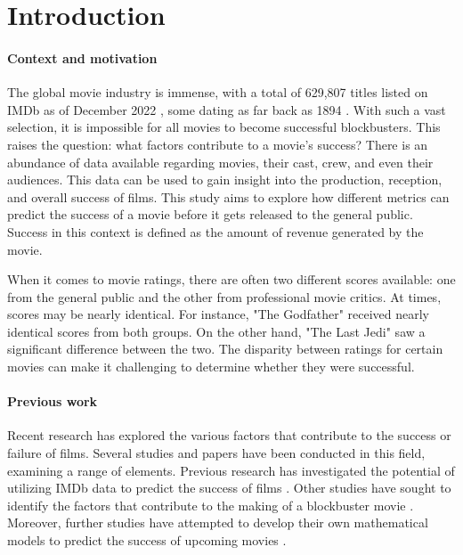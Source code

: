 \section{Introduction}
    \paragraph{Context and motivation}
        The global movie industry is immense, with a total of 629,807 titles listed on
            IMDb as of December 2022 \cite{imdbStats}, some dating as far back as 1894
            \cite{imdbOldest}.
        With such a vast selection, it is impossible for all movies to become
            successful blockbusters.
        This raises the question: what factors contribute to a movie's success?
        There is an abundance of data available regarding movies, their cast, crew, and
            even their audiences.
        This data can be used to gain insight into the production, reception, and
            overall success of films.
        This study aims to explore how different metrics can predict the success of a
            movie before it gets released to the general public.
        Success in this context is defined as the amount of revenue generated by the
            movie.

        When it comes to movie ratings, there are often two different scores available:
        one from the general public and the other from professional movie critics.
        At times, scores may be nearly identical.
        For instance, "The Godfather" \cite{rottenTomatoesGodfather} received nearly
            identical scores from both groups.
        On the other hand, "The Last Jedi" \cite{rottenTomatoesLastJedi} saw a
            significant difference between the two.
        The disparity between ratings for certain movies can make it challenging to
            determine whether they were successful.

    \paragraph{Previous work}
        Recent research has explored the various factors that contribute to the success
            or failure of films.
        Several studies and papers have been conducted in this field, examining a range
            of elements.
        Previous research has investigated the potential of utilizing IMDb data to
            predict the success of films \cite{dhirRaj}.
        Other studies have sought to identify the factors that contribute to the making
            of a blockbuster movie \cite{collinsHandSnell}.
        Moreover, further studies have attempted to develop their own mathematical
            models to predict the success of upcoming movies
            \cite{ahmadDuraisamyYousefBuckles}.

